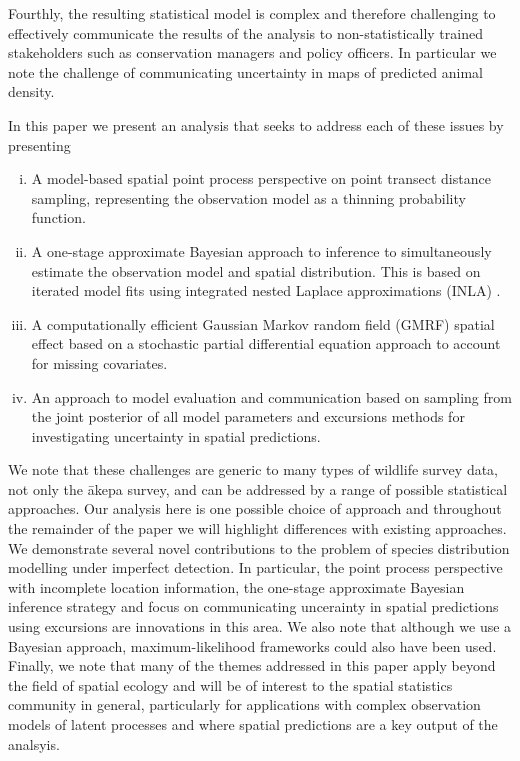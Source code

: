 \documentclass[preprint,12pt]{elsarticle}
\newcommand{\akepa}{\textquotesingle\={a}kepa}  %
\begin{document}
Fourthly, the resulting statistical model is complex and therefore challenging to effectively communicate the results of the analysis to non-statistically trained stakeholders such as conservation managers and policy officers.  In particular we note the challenge of communicating uncertainty in maps of predicted animal density.

In this paper we present an analysis that seeks to address each of these issues by presenting

\begin{enumerate}[(i)]
	\item A model-based spatial point process perspective on point transect distance sampling, representing the observation model as a thinning probability function.
	\item A one-stage approximate Bayesian approach to inference to simultaneously estimate the observation model and spatial distribution.  This is based on iterated model fits using integrated nested Laplace approximations (INLA) \citep{rue_approximate_2009}.
	\item A computationally efficient Gaussian Markov random field (GMRF) spatial effect based on a stochastic partial differential equation approach \citep{lindgren_explicit_2011} to account for missing covariates.
	\item An approach to model evaluation and communication based on sampling from the joint posterior of all model parameters and excursions methods \citep{bolin_excursion_2015} for investigating uncertainty in spatial predictions.
\end{enumerate}

We note that these challenges are generic to many types of wildlife survey data, not only the \akepa{} survey, and can be addressed by a range of possible statistical approaches.  Our analysis here is one possible choice of approach and throughout the remainder of the paper we will highlight differences with existing approaches.  We demonstrate several novel contributions to the problem of species distribution modelling under imperfect detection.  In particular, the point process perspective with incomplete location information, the one-stage approximate Bayesian inference strategy and focus on communicating uncerainty in spatial predictions using excursions are innovations in this area.  We also note that although we use a Bayesian approach, maximum-likelihood frameworks could also have been used.  Finally, we note that many of the themes addressed in this paper apply beyond the field of spatial ecology and will be of interest to the spatial statistics community in general, particularly for applications with complex observation models of latent processes and where spatial predictions are a key output of the analsyis.  
\end{document}
